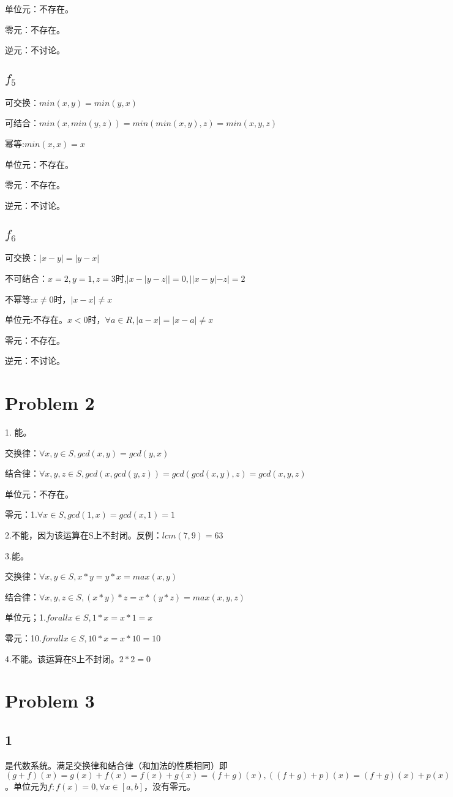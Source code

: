 \documentclass{article}
\begin{document}
单位元：不存在。

零元：不存在。

逆元：不讨论。

\subsection*{$f_5$}
可交换：$min(x,y)=min(y,x)$

可结合：$min(x,min(y,z))=min(min(x,y),z)=min(x,y,z)$

幂等:$min(x,x)=x$

单位元：不存在。

零元：不存在。

逆元：不讨论。

\subsection*{$f_6$}
可交换：$|x-y|=|y-x|$

不可结合：$x=2,y=1,z=3$时,$|x-|y-z||=0,||x-y|-z|=2$

不幂等:$x\neq 0$时，$|x-x|\neq x$

单位元:不存在。$x<0$时，$\forall a\in R,|a-x|=|x-a|\neq x$

零元：不存在。

逆元：不讨论。
\section*{Problem 2}
1.
能。

交换律：$\forall x,y\in S,gcd(x,y)=gcd(y,x)$

结合律：$\forall x,y,z\in S,gcd(x,gcd(y,z))=gcd(gcd(x,y),z)=gcd(x,y,z)$

单位元：不存在。

零元：1.$\forall x\in S,gcd(1,x)=gcd(x,1)=1$

2.不能，因为该运算在S上不封闭。反例：$lcm(7,9)=63$

3.能。

交换律：$\forall x,y\in S,x*y=y*x = max(x,y)$

结合律：$\forall x,y,z\in S,(x*y)*z=x*(y*z)=max(x,y,z)$

单位元；1.$forall x\in S,1*x=x*1=x$

零元：10.$forall x\in S,10*x=x*10=10$

4.不能。该运算在S上不封闭。$2*2=0$
\section*{Problem 3}
\subsection*{1}
是代数系统。满足交换律和结合律（和加法的性质相同）即$(g+f)(x)=g(x)+f(x)=f(x)+g(x)=(f+g)(x),((f+g)+p)(x)=(f+g)(x)+p(x)=f(x)+g(x)+p(x)=f(x)+(g+p)(x)=(f+(g+p))$。单位元为$f:f(x)=0,\forall x\in [a,b]$，没有零元。
\end{document}
